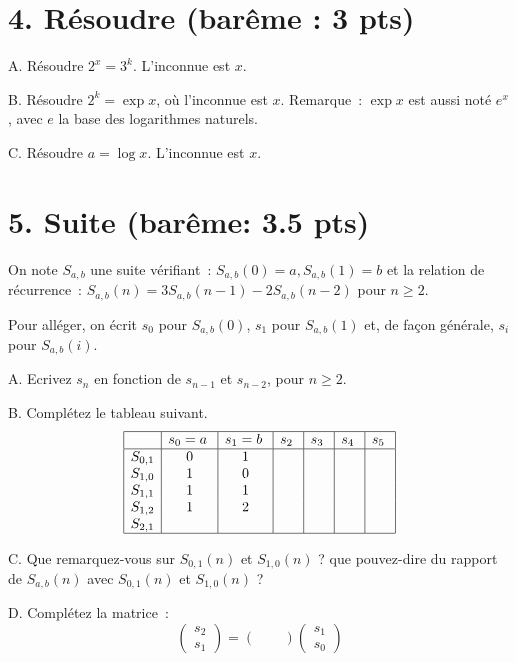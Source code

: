 \documentclass[11pt]{article}
\begin{document}
{
\section*{4. Résoudre (barême : 3 pts)}
A. Résoudre $2^x= 3^k$. L'inconnue est $x$.

\medskip
B. Résoudre $2^k= \exp x$, où l'inconnue est $x$. Remarque~: $\exp x$ est aussi noté $e^x$, avec $e$ la base des logarithmes naturels.  

\medskip
C. Résoudre $a=\log x$. L'inconnue est $x$.
}

\section*{5. Suite (barême: 3.5 pts)}
On note $S_{a,b}$ une suite vérifiant~: $S_{a,b}(0)=a, S_{a,b}(1)=b$
et  la relation de récurrence~: $S_{a,b}(n)= 3 S_{a,b}(n-1) - 2 S_{a,b}(n-2)$ pour $n\ge 2$.

\medskip
Pour alléger, on écrit $s_0$ pour $S_{a,b}(0)$, $s_1$ pour $S_{a,b}(1)$
et, de façon générale, $s_i$ pour $S_{a,b}(i)$.

\medskip
A. Ecrivez  $s_n$ en fonction de  $s_{n-1}$ et  $s_{n-2}$, pour $n\ge 2$.

\medskip
B. Complétez le tableau suivant. 
$$
\begin{array}{|c|c|c|c|c|c|c|}
\hline
& s_0=a\; &  s_1=b\; & s_2\;  & s_3\;  & s_4\;  & s_5\;  \\
\hline 
S_{0,1} & 0 & 1 & & & &  \\
S_{1,0}  & 1 & 0 & & & &  \\
S_{1,1}  & 1 & 1 & & & & \\
S_{1,2}  & 1 & 2 & & & & \\
S_{2,1} & & & & & &\\
\hline 
\end{array}
$$

\medskip
C. Que remarquez-vous sur $S_{0,1}(n)$ et $S_{1,0}(n)$ ? que pouvez-dire du rapport de  $S_{a,b}(n)$  avec $S_{0,1}(n)$ et $S_{1,0}(n)$ ?

\medskip
D.
Complétez la matrice~:
$$
\left( \begin{array}{c}
s_2 \\
s_1 \end{array} \right) = \left( \begin{array}{cc}
~ & ~ \\
~ & ~ \end{array} \right) \left( \begin{array}{c}
s_1 \\
s_0 \end{array} \right)
$$
\end{document}

